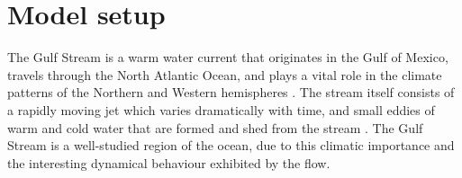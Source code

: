 \section{Model setup}\label{sec:appl_ocean}
The Gulf Stream is a warm water current that originates in the Gulf of Mexico, travels through the North Atlantic Ocean, and plays a vital role in the climate patterns of the Northern and Western hemispheres \citep{Palter_2015_RoleGulfStream}.
The stream itself consists of a rapidly moving jet which varies dramatically with time, and small eddies of warm and cold water that are formed and shed from the stream \citep{KangCurchitser_2013_GulfStreamEddy}.
The Gulf Stream is a well-studied region of the ocean, due to this climatic importance and the interesting dynamical behaviour exhibited by the flow.

